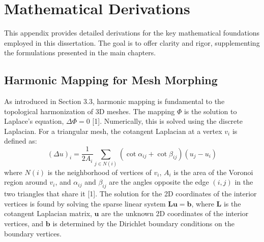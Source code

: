 \documentclass[dsc, EN]{ufabcFHZh}
\begin{document}
{%

%

\appendix
\chapter{Mathematical Derivations}
\label{app:math_derivations}

This appendix provides detailed derivations for the key mathematical foundations employed in this dissertation. The goal is to offer clarity and rigor, supplementing the formulations presented in the main chapters.

\section{Harmonic Mapping for Mesh Morphing}
\label{sec:harmonic_mapping_derivation}

As introduced in Section 3.3, harmonic mapping is fundamental to the topological harmonization of 3D meshes. The mapping $\Phi$ is the solution to Laplace's equation, $\Delta\Phi=0$ {[1]}. Numerically, this is solved using the discrete Laplacian. For a triangular mesh, the cotangent Laplacian at a vertex $v_i$ is defined as:
\begin{equation}
    (\Delta u)_i = \frac{1}{2A_i} \sum_{j \in N(i)} (\cot \alpha_{ij} + \cot \beta_{ij})(u_j - u_i)
\end{equation}
where $N(i)$ is the neighborhood of vertices of $v_i$, $A_i$ is the area of the Voronoi region around $v_i$, and $\alpha_{ij}$ and $\beta_{ij}$ are the angles opposite the edge $(i, j)$ in the two triangles that share it {[1]}. The solution for the 2D coordinates of the interior vertices is found by solving the sparse linear system $\mathbf{L}\mathbf{u} = \mathbf{b}$, where $\mathbf{L}$ is the cotangent Laplacian matrix, $\mathbf{u}$ are the unknown 2D coordinates of the interior vertices, and $\mathbf{b}$ is determined by the Dirichlet boundary conditions on the boundary vertices.

}
\end{document}

